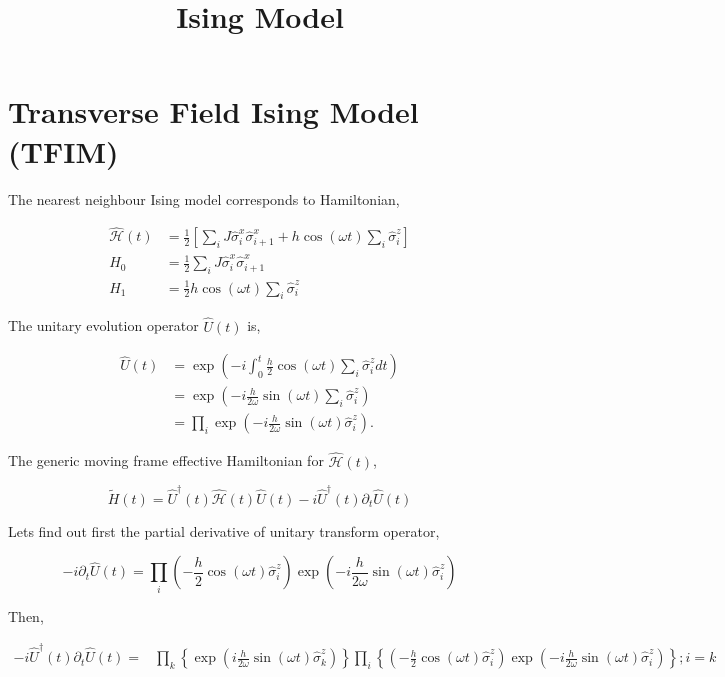 \documentclass[a4paper,11pt]{article}
\title{Ising Model}
\author{}
\date{}
\begin{document}
\maketitle
\section{Transverse Field Ising Model (TFIM)}
The nearest neighbour Ising model corresponds to Hamiltonian,

\begin{align}
\hat{\mathcal{H}}(t) & =\frac{1}{2}\left[\sum_{i} J \hat{\sigma}_{i}^{x} \hat{\sigma}_{i+1}^{x}+h \cos (\omega t) \sum_{i} \hat{\sigma}_{i}^{z}\right] \\
H_{0} & =\frac{1}{2} \sum_{i} J \hat{\sigma}_{i}^{x} \hat{\sigma}_{i+1}^{x} \\
H_{1} & =\frac{1}{2} h \cos (\omega t) \sum_{i} \hat{\sigma}_{i}^{z}
\end{align}

The unitary evolution operator $\hat{U}(t)$ is,


\begin{align}
\hat{U}(t) & =\exp \left(-i \int_{0}^{t} \frac{h}{2} \cos (\omega t) \sum_{i} \hat{\sigma}_{i}^{z} d t\right) \nonumber\\
& =\exp \left(-i \frac{h}{2 \omega} \sin (\omega t) \sum_{i} \hat{\sigma}_{i}^{z}\right) \\
& =\prod_{i} \exp \left(-i \frac{h}{2 \omega} \sin (\omega t) \hat{\sigma}_{i}^{z}\right) .
\end{align}


The generic moving frame effective Hamiltonian for $\hat{\mathcal{H}}(t)$,

\begin{equation}
\tilde{H}(t)=\hat{U}^{\dagger}(t) \hat{\mathcal{H}}(t) \hat{U}(t)-i \hat{U}^{\dagger}(t) \partial_{t} \hat{U}(t)
\label{eq:ht}
\end{equation}

Lets find out first the partial derivative of unitary transform operator,

\begin{equation}
-i \partial_{t} \hat{U}(t)=\prod_{i}\left(-\frac{h}{2} \cos (\omega t) \hat{\sigma}_{i}^{z}\right) \exp \left(-i \frac{h}{2 \omega} \sin (\omega t) \hat{\sigma}_{i}^{z}\right)
\end{equation}

Then,

\begin{align}
-i \hat{U}^{\dagger}(t) \partial_{t} \hat{U}(t)= & \prod_{k}\left\{\exp \left(i \frac{h}{2 \omega} \sin (\omega t) \hat{\sigma}_{k}^{z}\right)\right\} \prod_{i}\left\{\left(-\frac{h}{2} \cos (\omega t) \hat{\sigma}_{i}^{z}\right) \exp \left(-i \frac{h}{2 \omega} \sin (\omega t) \hat{\sigma}_{i}^{z}\right)\right\} ; i=k
\label{eq:eqpartial}
\end{align}
\end{document}
